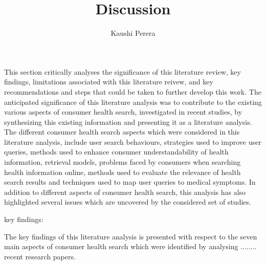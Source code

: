 \documentclass[]{article}
\title{Discussion}
\author{Kaushi Perera}
\begin{document}
	
\maketitle

This section critically analyses the significance of this literature review, key findings, limitations associated with this literature reivew, and key recommendations and steps that could be taken to further develop this work. The anticipated significance of this literature analysis was to contribute to the existing various aspects of consumer health search, investigated in recent studies, by synthesizing this existing information and presenting it as a literature analysis. The different consumer health search aspects which were considered in this literature analysis, include user search behaviours, strategies used to improve user queries, methods used to enhance consumer understandability of health information, retrieval models, problems faced by consumers when searching health information online, methods used to evaluate the relevance of health search results and techniques used to map user queries to medical symptoms. In addition to different aspects of consumer health search, this analysis has also highlighted several issues which are uncovered by the considered set of studies.   


key findings:

The key findings of this literature analysis is presented with respect to the seven main aspects of consumer health search which were identified by analysing ........ recent research papers. 
\end{document}
